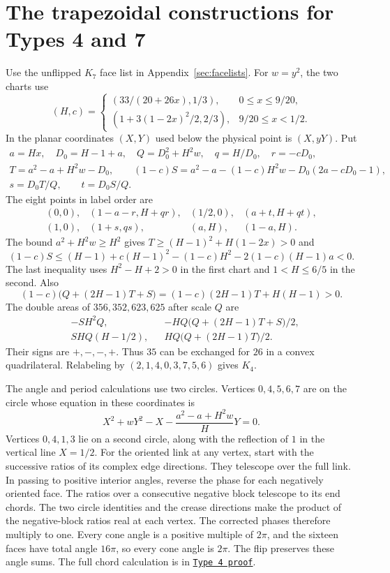 \documentclass[11pt,letterpaper]{amsart}
\newcommand{\release}{bd3a0e03908481d738df30233cf95c641a1d3f71}
\newcommand{\src}[2]{\href{https://github.com/vltanh/lean4-origami-torus/blob/\release/#1}{\texttt{#2}}}
\begin{document}
\section{The trapezoidal constructions for Types 4 and 7}\label{sec:strip}

Use the unflipped \(K_7\) face list in Appendix~\ref{sec:facelists}.
For \(w=y^2\), the two charts use
\[
 (H,c)=
 \begin{cases}
 (33/(20+26x),1/3),&0\le x\le9/20,\\
 (1+3(1-2x)^2/2,2/3),&9/20\le x<1/2.
 \end{cases}
\]
In the planar coordinates \((X,Y)\) used below the physical point
is \((X,yY)\). Put
\[
 \begin{gathered}
 a=Hx,\quad D_0=H-1+a,\quad Q=D_0^2+H^2w,\quad
 q=H/D_0,\quad r=-cD_0,\\
 T=a^2-a+H^2w-D_0,\qquad
 (1-c)S=a^2-a-(1-c)H^2w-D_0(2a-cD_0-1),\\
 s=D_0T/Q,\qquad t=D_0S/Q.
 \end{gathered}
\]
The eight points in label order are
\[
 \begin{array}{llll}
 (0,0),&(1-a-r,H+qr),&(1/2,0),&(a+t,H+qt),\\
 (1,0),&(1+s,qs),&(a,H),&(1-a,H).
 \end{array}
\]
The bound \(a^2+H^2w\ge H^2\) gives
\(T\ge(H-1)^2+H(1-2x)>0\) and
\[
 (1-c)S\le (H-1)+c(H-1)^2-(1-c)H^2-2(1-c)(H-1)a<0.
\]
The last inequality uses \(H^2-H+2>0\) in the first chart
and \(1<H\le 6/5\) in the second. Also
\[
 (1-c)\bigl(Q+(2H-1)T+S\bigr)=(1-c)(2H-1)T+H(H-1)>0.
\]
The double areas of \(356,352,623,625\) after scale \(Q\) are
\[
 \begin{aligned}
 &-SH^2Q,\qquad &&-HQ\bigl(Q+(2H-1)T+S\bigr)/2,\\
 &SHQ(H-1/2), &&HQ\bigl(Q+(2H-1)T\bigr)/2.
 \end{aligned}
\]
Their signs are \(+,-,-,+\). Thus \(35\) can be exchanged for \(26\)
in a convex quadrilateral. Relabeling by \((2,1,4,0,3,7,5,6)\)
gives \(K_4\).

The angle and period calculations use two circles. Vertices
\(0,4,5,6,7\) are on the circle whose equation in these coordinates
is
\[
 X^2+wY^2-X-\frac{a^2-a+H^2w}{H}Y=0.
\]
Vertices \(0,4,1,3\) lie on a second circle, along with the
reflection of \(1\) in the vertical line \(X=1/2\). For the
oriented link at any vertex, start with the successive ratios of
its complex edge directions. They telescope over the full link.
In passing to positive interior angles, reverse the phase for
each negatively oriented face. The ratios over a consecutive
negative block telescope to its end chords. The two circle
identities and the crease directions make the product of the
negative-block ratios real at each vertex. The corrected phases
therefore multiply to one. Every cone angle is a positive
multiple of \(2\pi\), and the sixteen faces have total angle
\(16\pi\), so every cone angle is \(2\pi\). The flip preserves
these angle sums. The full chord calculation is in
\src{docs/EightVertex/Type4.md}{Type 4 proof}.
\end{document}
